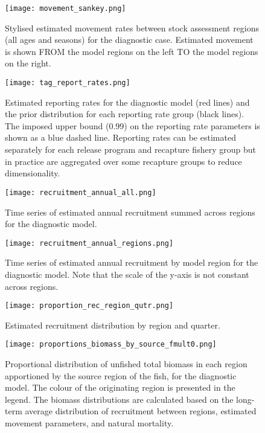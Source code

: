 \newpage
\begin{figure}[!ht]
  \centering
  \texttt{[image: movement\_sankey.png]}
  \caption{Stylised estimated movement rates between stock assessment regions (all ages and seasons) for the diagnostic case. Estimated movement is shown FROM the model regions on the left TO the model regions on the right. \label{fig:sankey_movement}}
\end{figure}
\clearpage

\newpage
\begin{figure}[!ht]
  \centering
  \texttt{[image: tag\_report\_rates.png]}
  \caption{Estimated reporting rates for the diagnostic model (red lines) and the prior distribution for each reporting rate group (black lines). The imposed upper bound (0.99) on the reporting rate parameters is shown as a blue dashed line. Reporting rates can be estimated separately for each release program and recapture fishery group but in practice are aggregated over some recapture groups to reduce dimensionality. \label{fig:tag_report_rates}}
\end{figure}
\clearpage

\newpage
\begin{figure}[!ht]
  \centering
  \texttt{[image: recruitment\_annual\_all.png]}
  \caption{Time series of estimated annual recruitment summed across regions for the diagnostic model.\label{fig:recruitment_annual_all}}
\end{figure}
\clearpage

\newpage
\begin{figure}[!ht]
  \centering
  \texttt{[image: recruitment\_annual\_regions.png]}
  \caption{Time series of estimated annual recruitment by model region for the diagnostic model. Note that the scale of the y-axis is not constant across regions.\label{fig:recruitment_annual_regions}}
\end{figure}
\clearpage

\newpage
\begin{figure}[!ht]
  \centering
  \texttt{[image: proportion\_rec\_region\_qutr.png]}
  \caption{Estimated recruitment distribution by region and quarter. \label{fig:proportion_rec_region_qutr}}
\end{figure}

\begin{figure}[!ht]
  \centering
  \texttt{[image: proportions\_biomass\_by\_source\_fmult0.png]}
  \caption{Proportional distribution of unfished total biomass in each region apportioned by the source region of the fish, for the diagnostic model. The colour of the originating region is presented in the legend. The biomass distributions are calculated based on the long-term average distribution of recruitment between regions, estimated movement parameters, and natural mortality. \label{fig:proportions_biomass_by_source_fmult0}}
\end{figure}
\clearpage

